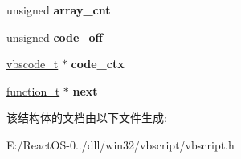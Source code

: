 \begin{DoxyCompactItemize}
unsigned {\bfseries array\+\_\+cnt}
\item 
\mbox{\label{struct__function__t_a24074c6cd27965cbb2f62f0b6d625466}} 
unsigned {\bfseries code\+\_\+off}
\item 
\mbox{\label{struct__function__t_a34ce37aa418db79853baba466284b22b}} 
\hyperlink{struct__vbscode__t}{vbscode\+\_\+t} $\ast$ {\bfseries code\+\_\+ctx}
\item 
\mbox{\label{struct__function__t_afa7595891723c4ba41e8eb1b9e8a2f2e}} 
\hyperlink{struct__function__t}{function\+\_\+t} $\ast$ {\bfseries next}
\end{DoxyCompactItemize}


该结构体的文档由以下文件生成\+:\begin{DoxyCompactItemize}
\item 
E\+:/\+React\+O\+S-\/0../dll/win32/vbscript/vbscript.\+h\end{DoxyCompactItemize}
